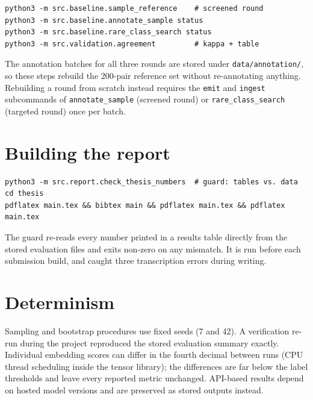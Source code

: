\begin{verbatim}
python3 -m src.baseline.sample_reference    # screened round
python3 -m src.baseline.annotate_sample status
python3 -m src.baseline.rare_class_search status
python3 -m src.validation.agreement         # kappa + table
\end{verbatim}

\noindent The annotation batches for all three rounds are stored under
\texttt{data/annotation/}, so these steps rebuild the 200-pair reference set
without re-annotating anything. Rebuilding a round from scratch instead requires
the \texttt{emit} and \texttt{ingest} subcommands of \texttt{annotate\_sample}
(screened round) or \texttt{rare\_class\_search} (targeted round) once per
batch.

\section*{Building the report}

\begin{verbatim}
python3 -m src.report.check_thesis_numbers  # guard: tables vs. data
cd thesis
pdflatex main.tex && bibtex main && pdflatex main.tex && pdflatex main.tex
\end{verbatim}

\noindent The guard re-reads every number printed in a results table directly
from the stored evaluation files and exits non-zero on any mismatch. It is run
before each submission build, and caught three transcription errors during
writing.

\section*{Determinism}

Sampling and bootstrap procedures use fixed seeds (7 and 42). A verification
re-run during the project reproduced the stored evaluation summary exactly.
Individual embedding scores can differ in the fourth decimal between runs
(CPU thread scheduling inside the tensor library); the differences are far
below the label thresholds and leave every reported metric unchanged.
API-based results depend on hosted model versions and are preserved as stored
outputs instead.
